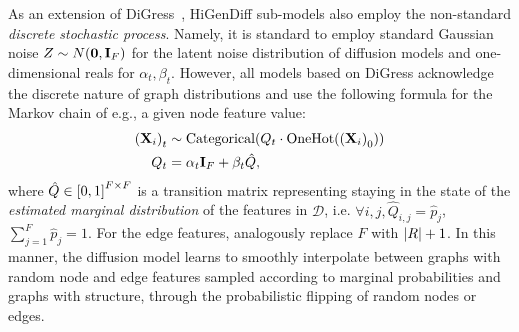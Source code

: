 As an extension of DiGress~\cite{vignac_digress_2022}, HiGenDiff sub-models also employ the non-standard \emph{discrete stochastic process}. Namely, it is standard to employ standard Gaussian noise $Z\sim N\mathopen{}\left(\mathbf{0},\mathbf{I}_F\right)$ for the latent noise distribution of diffusion models and one-dimensional reals for $\alpha_t,\beta_t$. However, all models based on DiGress acknowledge the discrete nature of graph distributions and use the following formula for the Markov chain of e.g., a given node feature value:
\begin{align}
\begin{split}
    \mathopen{}\left(\mathbf{X}_i\right)_t &\sim \text{Categorical}\mathopen{}\left(Q_t \cdot \text{OneHot}\mathopen{}\left(\mathopen{}\left(\mathbf{X}_i\right)_0\right)\right) \\
    Q_t &= \alpha_t \mathbf{I}_F + \beta_t \hat{Q},
\end{split}
\end{align}
where $\hat{Q} \in \mathopen{}\left[0,1\right]^{F \times F}$ is a transition matrix representing staying in the state of the \emph{estimated marginal distribution} of the features in $\mathcal{D}$, i.e. $\forall i,j,\hat{Q}_{i,j} = \hat{p}_j$, $\sum_{j=1}^{F}{\hat{p}_j}=1$. For the edge features, analogously replace $F$ with $\mathopen{}\left|R\right|+1$. In this manner, the diffusion model learns to smoothly interpolate between graphs with random node and edge features sampled according to marginal probabilities and graphs with structure, through the probabilistic flipping of random nodes or edges.

